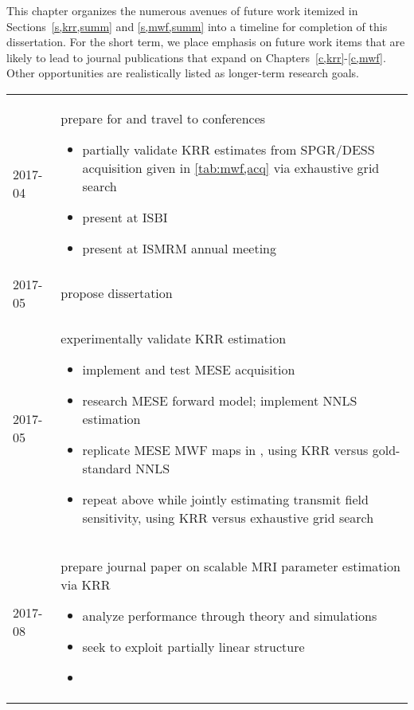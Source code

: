 
This chapter organizes the numerous avenues 
of future work itemized 
in Sections~\ref{s,krr,summ} and \ref{s,mwf,summ}
into a timeline for completion 
of this dissertation.
For the short term,
we place emphasis
on future work items
that are likely 
to lead 
to journal publications
that expand 
on Chapters~\ref{c,krr}-\ref{c,mwf}.
Other opportunities
are realistically listed 
as longer-term research goals.

\begin{table}[!ht]
	\centering
	\begin{tabular}{l | p{12cm}}
		\hline 
		\hline
		2017-04 & prepare for and travel to conferences
			\begin{itemize}
				\setlength\topsep{0em}
				\setlength\itemsep{0em}
				\item{
					partially validate KRR estimates 
					from SPGR/DESS acquisition 
					given in \ref{tab:mwf,acq}
					via exhaustive grid search
				}
				\item{present \cite{nataraj:17:dfm} at ISBI}
				\item{present \cite{nataraj:17:mwf} at ISMRM annual meeting}
			\end{itemize} \\
		2017-05 & propose dissertation \\
		2017-05 & experimentally validate KRR estimation
			\begin{itemize}
				\setlength\topsep{0em}
				\setlength\itemsep{0em}
				\item{implement and test MESE acquisition}
				\item{research MESE forward model; implement NNLS estimation}
				\item{
					replicate \invivo MESE MWF maps in \cite{zhang:15:com},
					using KRR versus gold-standard NNLS
				}
				\item{
					repeat above while jointly estimating transmit field sensitivity,
					using KRR versus exhaustive grid search
				}
			\end{itemize} \\
		2017-08 & prepare journal paper on scalable MRI parameter estimation via KRR
			\begin{itemize}
				\setlength\topsep{0em}
				\setlength\itemsep{0em}
				\item{analyze performance through theory and simulations}
				\item{seek to exploit partially linear structure}
				\item{
}
\end{itemize}
\end{tabular}
\end{table}
